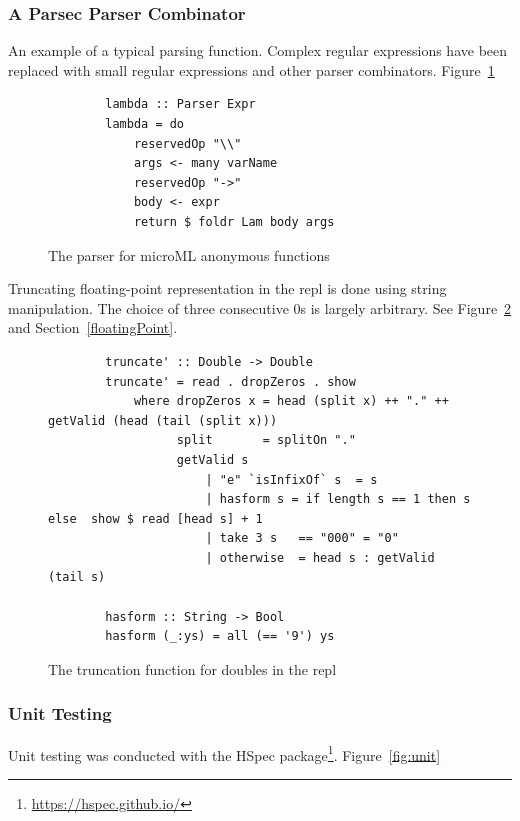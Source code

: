\subsubsection{A Parsec Parser Combinator}
An example of a typical parsing function. Complex regular expressions have been replaced with small
regular expressions and other parser combinators. Figure~\ref{fig:parsec}

\begin{figure}
    \begin{verbatim}
        lambda :: Parser Expr
        lambda = do
            reservedOp "\\"
            args <- many varName
            reservedOp "->"
            body <- expr
            return $ foldr Lam body args
    \end{verbatim}
    \caption{The parser for microML anonymous functions}
\label{fig:parsec}
\end{figure}

Truncating floating-point representation in the repl is done using string manipulation. The choice
of three consecutive 0s is largely arbitrary. See Figure~\ref{fig:trunc} and
Section~\ref{floatingPoint}.
\begin{figure}
    \begin{verbatim}
        truncate' :: Double -> Double
        truncate' = read . dropZeros . show
            where dropZeros x = head (split x) ++ "." ++ getValid (head (tail (split x)))
                  split       = splitOn "."
                  getValid s 
                      | "e" `isInfixOf` s  = s
                      | hasform s = if length s == 1 then s else  show $ read [head s] + 1
                      | take 3 s   == "000" = "0"
                      | otherwise  = head s : getValid (tail s) 

        hasform :: String -> Bool
        hasform (_:ys) = all (== '9') ys 
    \end{verbatim}
    \caption{The truncation function for doubles in the repl}
\label{fig:trunc}
\end{figure}

\subsubsection{Unit Testing}
Unit testing was conducted with the HSpec package\footnote{\url{https://hspec.github.io/}}.
Figure~\ref{fig:unit}

